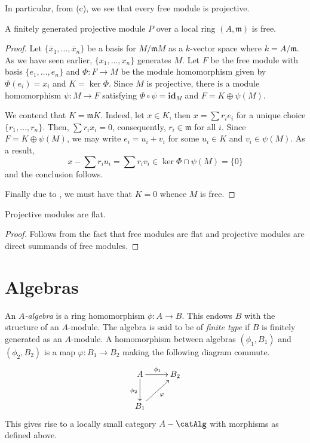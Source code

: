 In particular, from (c), we see that every free module is projective.

\begin{lemma}
    A finitely generated projective module $P$ over a local ring $(A,\mathfrak m)$ is free.
\end{lemma}
\begin{proof}
    Let $\{\overline x_1,\ldots,\overline x_n\}$ be a basis for $M/\mathfrak mM$ as a $k$-vector space where $k = A/\mathfrak m$. As we have seen earlier, $\{x_1,\ldots,x_n\}$ generates $M$. Let $F$ be the free module with basis $\{e_1,\ldots,e_n\}$ and $\Phi: F\to M$ be the module homomorphism given by $\Phi(e_i) = x_i$ and $K = \ker\Phi$. Since $M$ is projective, there is a module homomorphism $\psi: M\to F$ satisfying $\Phi\circ\psi = \mathbf{id}_M$ and $F = K\oplus\psi(M)$.

    We contend that $K = \mathfrak mK$. Indeed, let $x\in K$, then $x = \sum r_ie_i$ for a unique choice $\{r_1,\ldots,r_n\}$. Then, $\sum r_ix_i = 0$, consequently, $r_i\in\mathfrak m$ for all $i$. Since $F = K\oplus\psi(M)$, we may write $e_i = u_i + v_i$ for some $u_i\in K$ and $v_i\in\psi(M)$. As a result, 
    \begin{equation*}
        x - \sum r_iu_i = \sum r_iv_i\in\ker\Phi\cap\psi(M) = \{0\}
    \end{equation*}
    and the conclusion follows.

    Finally due to , we must have that $K = 0$ whence $M$ is free.
\end{proof}

\begin{proposition}
    Projective modules are flat.
\end{proposition}
\begin{proof}
    Follows from the fact that free modules are flat and projective modules are direct summands of free modules.
\end{proof}

\section{Algebras}

\begin{definition}
    An \textit{$A$-algebra} is a ring homomorphism $\phi: A\to B$. This endows $B$ with the structure of an $A$-module. The algebra is said to be of \textit{finite type} if $B$ is finitely generated as an $A$-module. A homomorphism between algebras $(\phi_1,B_1)$ and $(\phi_2,B_2)$ is a map $\varphi: B_1\to B_2$ making the following diagram commute.
    \begin{equation*}
        \xymatrix{
            A\ar[r]^{\phi_1}\ar[d]_{\phi_2} & B_2\\
            B_1\ar[ru]_{\varphi}
        }
    \end{equation*}
    This gives rise to a locally small category $A-\catAlg$ with morphisms as defined above.
\end{definition}

